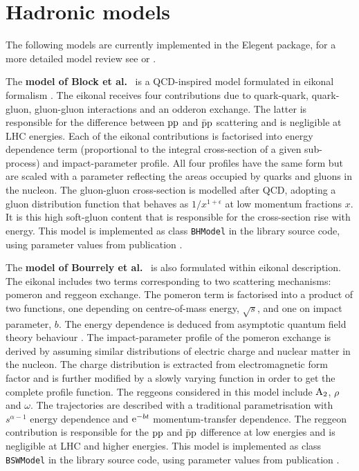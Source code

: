 \documentclass[preprint,12pt]{elsarticle}
\def\class#1{{\tt #1}}
\def\e{{\rm e}}
\begin{document}

\section{Hadronic models}\label{s:had mod}

The following models are currently implemented in the Elegent package, for a more detailed model review see \cite[section 1.1]{jan_thesis} or \cite[section 4]{dremin13}.

The {\bf model of Block et al.}~\cite{bh99,block06} is a QCD-inspired model formulated in eikonal formalism . The eikonal receives four contributions due to quark-quark, quark-gluon, gluon-gluon interactions and an odderon exchange. The latter is responsible for the difference between $\rm pp$ and $\rm \bar p p$ scattering and is negligible at LHC energies. Each of the eikonal contributions is factorised into energy dependence term (proportional to the integral cross-section of a given sub-process) and impact-parameter profile. All four profiles have the same form but are scaled with a parameter reflecting the areas occupied by quarks and gluons in the nucleon. The gluon-gluon cross-section is modelled after QCD, adopting a gluon distribution function that behaves as $1/x^{1+\epsilon}$ at low momentum fractions $x$. It is this high soft-gluon content that is responsible for the cross-section rise with energy. This model is implemented as class \class{BHModel} in the library source code, using parameter values from publication \cite{block06}.

The {\bf model of Bourrely et al.}~\cite{bsw79,bsw84,bsw03,bsw11} is also formulated within eikonal description. The eikonal includes two terms corresponding to two scattering mechanisms: pomeron and reggeon exchange. The pomeron term is factorised into a product of two functions, one depending on centre-of-mass energy, $\sqrt s$, and one on impact parameter, $b$. The energy dependence is deduced from asymptotic quantum field theory behaviour \cite{wu70}. The impact-parameter profile of the pomeron exchange is derived by assuming similar distributions of electric charge and nuclear matter in the nucleon. The charge distribution is extracted from electromagnetic form factor and is further modified by a slowly varying function in order to get the complete profile function. The reggeons considered in this model include $\rm A_2$, $\rho$ and $\omega$. The trajectories are described with a traditional parametrisation with $s^{\alpha - 1}$ energy dependence and $\e^{-bt}$ momentum-transfer dependence. The reggeon contribution is responsible for the $\rm pp$ and $\rm \bar pp$ difference at low energies and is negligible at LHC and higher energies. This model is implemented as class \class{BSWModel} in the library source code, using parameter values from publication \cite{bsw03}.
\end{document}
